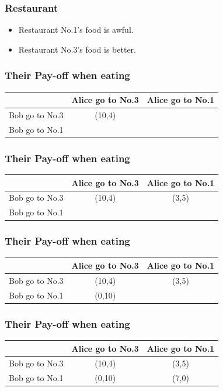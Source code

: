 \documentclass{beamer}
\begin{document}
\begin{frame}
\frametitle{Restaurant}
\begin{itemize}
\item Restaurant No.1's food is awful.
\item Restaurant No.3's food is better.
\end{itemize}

\end{frame}

\begin{frame}
\frametitle{Their Pay-off when eating}
\begin{tabular}{|c|c|c|}
\hline
\hline
    & {\color{red}Alice} go to No.3 & {\color{red}Alice} go to No.1\\
\hline
{\color{blue}Bob} go to No.3 & ({\color{blue}10},{\color{red}4}) & \\
\hline
{\color{blue}Bob} go to No.1 &  & \\
\hline
\hline
\end{tabular}
\end{frame}

\begin{frame}
\frametitle{Their Pay-off when eating}
\begin{tabular}{|c|c|c|}
\hline
\hline
    & {\color{red}Alice} go to No.3 & {\color{red}Alice} go to No.1\\
\hline
{\color{blue}Bob} go to No.3 & ({\color{blue}10},{\color{red}4}) & ({\color{blue}3},{\color{red}5})\\
\hline
{\color{blue}Bob} go to No.1 &  & \\
\hline
\hline
\end{tabular}
\end{frame}

\begin{frame}
\frametitle{Their Pay-off when eating}
\begin{tabular}{|c|c|c|}
\hline
\hline
    & {\color{red}Alice} go to No.3 & {\color{red}Alice} go to No.1\\
\hline
{\color{blue}Bob} go to No.3 & ({\color{blue}10},{\color{red}4}) & ({\color{blue}3},{\color{red}5})\\
\hline
{\color{blue}Bob} go to No.1 & ({\color{blue}0},{\color{red}10}) & \\
\hline
\hline
\end{tabular}
\end{frame}

\begin{frame}
\frametitle{Their Pay-off when eating}
\begin{tabular}{|c|c|c|}
\hline
\hline
    & {\color{red}Alice} go to No.3 & {\color{red}Alice} go to No.1\\
\hline
{\color{blue}Bob} go to No.3 & ({\color{blue}10},{\color{red}4}) & ({\color{blue}3},{\color{red}5})\\
\hline
{\color{blue}Bob} go to No.1 & ({\color{blue}0},{\color{red}10}) & ({\color{blue}7},{\color{red}0})\\
\hline
\hline
\end{tabular}
\end{frame}
\end{document}

